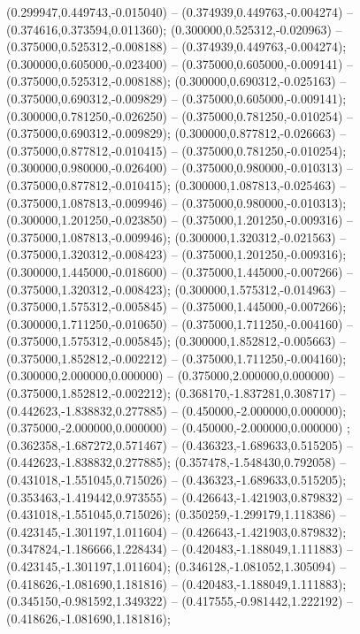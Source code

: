  (0.299947,0.449743,-0.015040) -- (0.374939,0.449763,-0.004274) -- (0.374616,0.373594,0.011360);
 (0.300000,0.525312,-0.020963) -- (0.375000,0.525312,-0.008188) -- (0.374939,0.449763,-0.004274);
 (0.300000,0.605000,-0.023400) -- (0.375000,0.605000,-0.009141) -- (0.375000,0.525312,-0.008188);
 (0.300000,0.690312,-0.025163) -- (0.375000,0.690312,-0.009829) -- (0.375000,0.605000,-0.009141);
 (0.300000,0.781250,-0.026250) -- (0.375000,0.781250,-0.010254) -- (0.375000,0.690312,-0.009829);
 (0.300000,0.877812,-0.026663) -- (0.375000,0.877812,-0.010415) -- (0.375000,0.781250,-0.010254);
 (0.300000,0.980000,-0.026400) -- (0.375000,0.980000,-0.010313) -- (0.375000,0.877812,-0.010415);
 (0.300000,1.087813,-0.025463) -- (0.375000,1.087813,-0.009946) -- (0.375000,0.980000,-0.010313);
 (0.300000,1.201250,-0.023850) -- (0.375000,1.201250,-0.009316) -- (0.375000,1.087813,-0.009946);
 (0.300000,1.320312,-0.021563) -- (0.375000,1.320312,-0.008423) -- (0.375000,1.201250,-0.009316);
 (0.300000,1.445000,-0.018600) -- (0.375000,1.445000,-0.007266) -- (0.375000,1.320312,-0.008423);
 (0.300000,1.575312,-0.014963) -- (0.375000,1.575312,-0.005845) -- (0.375000,1.445000,-0.007266);
 (0.300000,1.711250,-0.010650) -- (0.375000,1.711250,-0.004160) -- (0.375000,1.575312,-0.005845);
 (0.300000,1.852812,-0.005663) -- (0.375000,1.852812,-0.002212) -- (0.375000,1.711250,-0.004160);
 (0.300000,2.000000,0.000000) -- (0.375000,2.000000,0.000000) -- (0.375000,1.852812,-0.002212);
 (0.368170,-1.837281,0.308717) -- (0.442623,-1.838832,0.277885) -- (0.450000,-2.000000,0.000000);
 (0.375000,-2.000000,0.000000) -- (0.450000,-2.000000,0.000000) ;
 (0.362358,-1.687272,0.571467) -- (0.436323,-1.689633,0.515205) -- (0.442623,-1.838832,0.277885);
 (0.357478,-1.548430,0.792058) -- (0.431018,-1.551045,0.715026) -- (0.436323,-1.689633,0.515205);
 (0.353463,-1.419442,0.973555) -- (0.426643,-1.421903,0.879832) -- (0.431018,-1.551045,0.715026);
 (0.350259,-1.299179,1.118386) -- (0.423145,-1.301197,1.011604) -- (0.426643,-1.421903,0.879832);
 (0.347824,-1.186666,1.228434) -- (0.420483,-1.188049,1.111883) -- (0.423145,-1.301197,1.011604);
 (0.346128,-1.081052,1.305094) -- (0.418626,-1.081690,1.181816) -- (0.420483,-1.188049,1.111883);
 (0.345150,-0.981592,1.349322) -- (0.417555,-0.981442,1.222192) -- (0.418626,-1.081690,1.181816);
